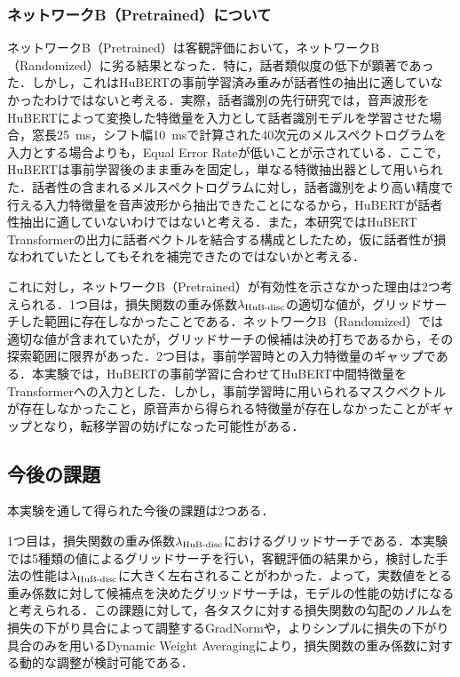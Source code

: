 \subsubsection{ネットワークB（Pretrained）について}
ネットワークB（Pretrained）は客観評価において，ネットワークB（Randomized）に劣る結果となった．特に，話者類似度の低下が顕著であった．しかし，これはHuBERTの事前学習済み重みが話者性の抽出に適していなかったわけではないと考える．実際，話者識別の先行研究\cite{chen2022large}では，音声波形をHuBERTによって変換した特徴量を入力として話者識別モデルを学習させた場合，窓長\SI{25}{\ms}，シフト幅\SI{10}{\ms}で計算された40次元のメルスペクトログラムを入力とする場合よりも，Equal Error Rateが低いことが示されている．ここで，HuBERTは事前学習後のまま重みを固定し，単なる特徴抽出器として用いられた．話者性の含まれるメルスペクトログラムに対し，話者識別をより高い精度で行える入力特徴量を音声波形から抽出できたことになるから，HuBERTが話者性抽出に適していないわけではないと考える．また，本研究ではHuBERT Transformerの出力に話者ベクトルを結合する構成としたため，仮に話者性が損なわれていたとしてもそれを補完できたのではないかと考える．

これに対し，ネットワークB（Pretrained）が有効性を示さなかった理由は2つ考えられる．1つ目は，損失関数の重み係数$\lambda_{\text{HuB-disc}}$の適切な値が，グリッドサーチした範囲に存在しなかったことである．ネットワークB（Randomized）では適切な値が含まれていたが，グリッドサーチの候補は決め打ちであるから，その探索範囲に限界があった．2つ目は，事前学習時との入力特徴量のギャップである．本実験では，HuBERTの事前学習に合わせてHuBERT中間特徴量をTransformerへの入力とした．しかし，事前学習時に用いられるマスクベクトルが存在しなかったこと，原音声から得られる特徴量が存在しなかったことがギャップとなり，転移学習の妨げになった可能性がある．

\subsection{今後の課題}
本実験を通して得られた今後の課題は2つある．

1つ目は，損失関数の重み係数$\lambda_{\text{HuB-disc}}$におけるグリッドサーチである．本実験では5種類の値によるグリッドサーチを行い，客観評価の結果から，検討した手法の性能は$\lambda_{\text{HuB-disc}}$に大きく左右されることがわかった．よって，実数値をとる重み係数に対して候補点を決めたグリッドサーチは，モデルの性能の妨げになると考えられる．この課題に対して，各タスクに対する損失関数の勾配のノルムを損失の下がり具合によって調整するGradNorm\cite{chen2018gradnorm}や，よりシンプルに損失の下がり具合のみを用いるDynamic Weight Averaging\cite{liu2019end}により，損失関数の重み係数に対する動的な調整が検討可能である．


